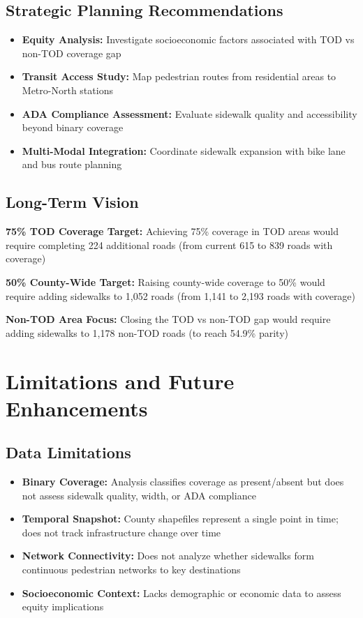 \documentclass[11pt,letterpaper]{article}
\begin{document}
\subsection{Strategic Planning Recommendations}

\begin{itemize}
    \item \textbf{Equity Analysis:} Investigate socioeconomic factors associated with TOD vs non-TOD coverage gap
    \item \textbf{Transit Access Study:} Map pedestrian routes from residential areas to Metro-North stations
    \item \textbf{ADA Compliance Assessment:} Evaluate sidewalk quality and accessibility beyond binary coverage
    \item \textbf{Multi-Modal Integration:} Coordinate sidewalk expansion with bike lane and bus route planning
\end{itemize}

\subsection{Long-Term Vision}

\textbf{75\% TOD Coverage Target:} Achieving 75\% coverage in TOD areas would require completing 224 additional roads (from current 615 to 839 roads with coverage)

\textbf{50\% County-Wide Target:} Raising county-wide coverage to 50\% would require adding sidewalks to 1,052 roads (from 1,141 to 2,193 roads with coverage)

\textbf{Non-TOD Area Focus:} Closing the TOD vs non-TOD gap would require adding sidewalks to 1,178 non-TOD roads (to reach 54.9\% parity)

\section{Limitations and Future Enhancements}

\subsection{Data Limitations}

\begin{itemize}
    \item \textbf{Binary Coverage:} Analysis classifies coverage as present/absent but does not assess sidewalk quality, width, or ADA compliance
    \item \textbf{Temporal Snapshot:} County shapefiles represent a single point in time; does not track infrastructure change over time
    \item \textbf{Network Connectivity:} Does not analyze whether sidewalks form continuous pedestrian networks to key destinations
    \item \textbf{Socioeconomic Context:} Lacks demographic or economic data to assess equity implications
\end{itemize}
\end{document}
